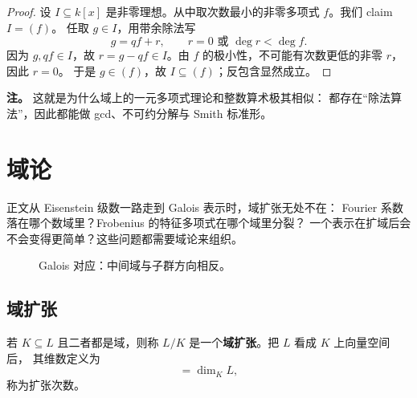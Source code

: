 \begin{proof}
设 $I\subseteq k[x]$ 是非零理想。从中取次数最小的非零多项式 $f$。我们 claim $I=(f)$。
任取 $g\in I$，用带余除法写
\[
  g=qf+r,
  \qquad r=0\text{ 或 }\deg r<\deg f.
\]
因为 $g,qf\in I$，故 $r=g-qf\in I$。由 $f$ 的极小性，不可能有次数更低的非零 $r$，因此 $r=0$。
于是 $g\in(f)$，故 $I\subseteq (f)$；反包含显然成立。
\end{proof}

\textbf{注。} 这就是为什么域上的一元多项式理论和整数算术极其相似：
都存在“除法算法”，因此都能做 gcd、不可约分解与 Smith 标准形。

\section{域论}
\label{sec:app-field-theory}

正文从 Eisenstein 级数一路走到 Galois 表示时，域扩张无处不在：
Fourier 系数落在哪个数域里？Frobenius 的特征多项式在哪个域里分裂？
一个表示在扩域后会不会变得更简单？这些问题都需要域论来组织。

\begin{figure}[H]
\centering
{}
\caption{Galois 对应：中间域与子群方向相反。}
\end{figure}

\subsection{域扩张}

\begin{definition}[域扩张]
若 $K\subseteq L$ 且二者都是域，则称 $L/K$ 是一个\textbf{域扩张}。把 $L$ 看成 $K$ 上向量空间后，
其维数定义为
\begin{equation}
  [L:K]=\dim_K L,
\end{equation}
称为扩张次数。
\end{definition}

